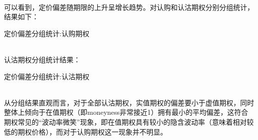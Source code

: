 ~\\
可以看到，定价偏差随期限的上升呈增长趋势。对认购和认沽期权分别分组统计，结果如下：
~\\
\begin{center}
    \begin{threeparttable}[H]
        \begin{small}
            \caption{定价偏差分组统计:认购期权}
            \label{tab:call_option_bias_group}
                
        \end{small}
    \end{threeparttable}
        
\end{center}
~\\
认沽期权分组统计结果：
~\\
\begin{center}
    \begin{threeparttable}[H]
        \begin{small}
            \caption{定价偏差分组统计:认沽期权}
            \label{tab:put_option_bias_group}
                
    
        \end{small}
    \end{threeparttable}
        
\end{center}
~\\
从分组结果直观而言，对于全部认沽期权，实值期权的偏差要小于虚值期权，同时整体上倾向于在值期权（即moneyness非常接近1）拥有最小的平均偏差，这符合期权常见的“波动率微笑”现象，即在值期权具有较小的隐含波动率（意味着相对较低的期权价格），而对于认购期权这一现象并不明显。

